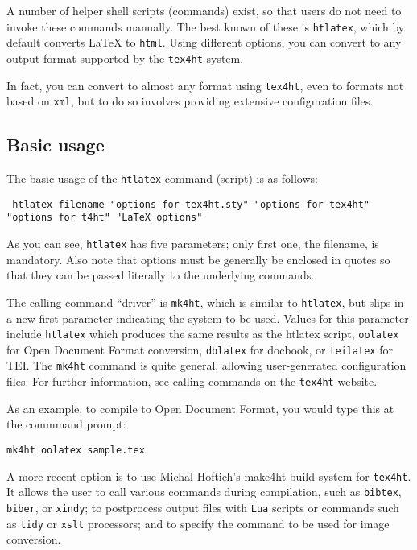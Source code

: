 A number of helper shell scripts (commands) exist, so that users do not
need to invoke these commands manually. The best known of these is
\texttt{htlatex}, which by default converts LaTeX to \texttt{html}.
Using different options, you can convert to any output format supported
by the \texttt{tex4ht} system.

In fact, you can convert to almost any format using \texttt{tex4ht},
even to formats not based on \texttt{xml}, but to do so involves
providing extensive configuration files.

\hypertarget{basic-usage}{%
\subsection{Basic usage}\label{basic-usage}}

The basic usage of the \texttt{htlatex} command (script) is as follows:

\begin{verbatim}
 htlatex filename "options for tex4ht.sty" "options for tex4ht" "options for t4ht" "LaTeX options"
\end{verbatim}

As you can see, \texttt{htlatex} has five parameters; only first one,
the filename, is mandatory. Also note that options must be generally be
enclosed in quotes so that they can be passed literally to the
underlying commands.

The calling command ``driver'' is \texttt{mk4ht}, which is similar to
\texttt{htlatex}, but slips in a new first parameter indicating the
system to be used. Values for this parameter include \texttt{htlatex}
which produces the same results as the htlatex script, \texttt{oolatex}
for Open Document Format conversion, \texttt{dblatex} for docbook, or
\texttt{teilatex} for TEI. The \texttt{mk4ht} command is quite general,
allowing user-generated configuration files. For further information,
see
\href{https://www.tug.org/applications/tex4ht/mn-commands.html\#QQ1-9-33}{calling
commands} on the \texttt{tex4ht} website.

As an example, to compile to Open Document Format, you would type this
at the commmand prompt:

\begin{verbatim}
mk4ht oolatex sample.tex
\end{verbatim}

A more recent option is to use Michal Hoftich's
\href{https://github.com/michal-h21/make4ht}{make4ht} build system for
\texttt{tex4ht}. It allows the user to call various commands during
compilation, such as \texttt{bibtex}, \texttt{biber}, or \texttt{xindy};
to postprocess output files with \texttt{Lua} scripts or commands such
as \texttt{tidy} or \texttt{xslt} processors; and to specify the command
to be used for image conversion.

